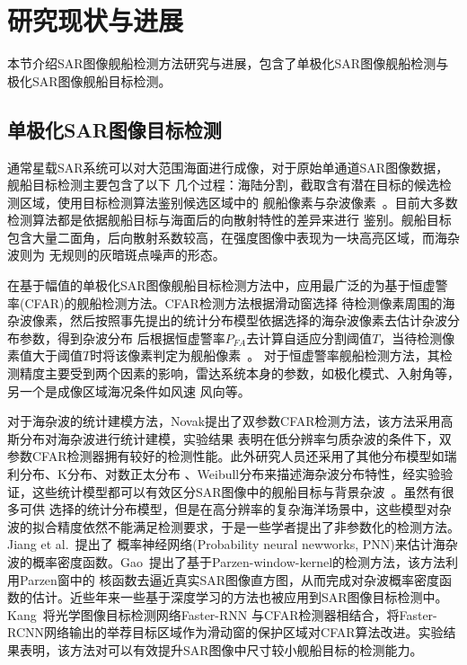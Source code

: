 \section{研究现状与进展}
  本节介绍SAR图像舰船检测方法研究与进展，包含了单极化SAR图像舰船检测与极化SAR图像舰船目标检测。
\subsection{单极化SAR图像目标检测}
    通常星载SAR系统可以对大范围海面进行成像，对于原始单通道SAR图像数据，舰船目标检测主要包含了以下
    几个过程：海陆分割，截取含有潜在目标的候选检测区域，使用目标检测算法鉴别候选区域中的
    舰船像素与杂波像素~\cite{article}。目前大多数检测算法都是依据舰船目标与海面后的向散射特性的差异来进行
    鉴别。舰船目标包含大量二面角，后向散射系数较高，在强度图像中表现为一块高亮区域，而海杂波则为
    无规则的灰暗斑点噪声的形态。

    在基于幅值的单极化SAR图像舰船目标检测方法中，应用最广泛的为基于恒虚警率(CFAR)的舰船检测方法。CFAR检测方法根据滑动窗选择
    待检测像素周围的海杂波像素，然后按照事先提出的统计分布模型依据选择的海杂波像素去估计杂波分布参数，得到杂波分布
    后根据恒虚警率$P_{FA}$去计算自适应分割阈值$T$，当待检测像素值大于阈值$T$时将该像素判定为舰船像素~\cite{王兆成2017基于单极化}。
    对于恒虚警率舰船检测方法，其检测精度主要受到两个因素的影响，雷达系统本身的参数，如极化模式、入射角等，另一个是成像区域海况条件如风速
    风向等。

    对于海杂波的统计建模方法，Novak\cite{Novak}提出了双参数CFAR检测方法，该方法采用高斯分布对海杂波进行统计建模，实验结果
    表明在低分辨率匀质杂波的条件下，双参数CFAR检测器拥有较好的检测性能。此外研究人员还采用了其他分布模型如瑞利分布、K分布、对数正太分布
    、Weibull分布来描述海杂波分布特性，经实验验证，这些统计模型都可以有效区分SAR图像中的舰船目标与背景杂波~\cite{Carretero2010Statistical}。虽然有很多可供
    选择的统计分布模型，但是在高分辨率的复杂海洋场景中，这些模型对杂波的拟合精度依然不能满足检测要求，于是一些学者提出了非参数化的检测方法。Jiang et al.~\cite{Q2000Automatic}提出了
    概率神经网络(Probability neural newworks, PNN)来估计海杂波的概率密度函数。Gao~\cite{Gao2011A}提出了基于Parzen-window-kernel的检测方法，该方法利用Parzen窗中的
    核函数去逼近真实SAR图像直方图，从而完成对杂波概率密度函数的估计。近些年来一些基于深度学习的方法也被应用到SAR图像目标检测中。Kang~\cite{Miao2017A}将光学图像目标检测网络Faster-RNN
    与CFAR检测器相结合，将Faster-RCNN网络输出的举荐目标区域作为滑动窗的保护区域对CFAR算法改进。实验结果表明，该方法对可以有效提升SAR图像中尺寸较小舰船目标的检测能力。



